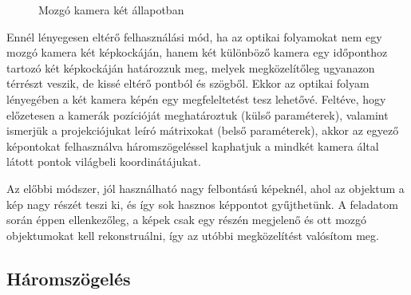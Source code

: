 \begin{figure}[tbh]
\caption{Mozgó kamera két állapotban \label{fig:triangulation}}
\end{figure}

Ennél lényegesen eltérő felhasználási mód, ha az optikai folyamokat nem egy mozgó kamera két képkockáján, hanem két különböző kamera egy időponthoz tartozó két képkockáján határozzuk meg, melyek megközelítőleg ugyanazon térrészt veszik, de kissé eltérő pontból és szögből. Ekkor az optikai folyam lényegében a két kamera képén egy megfeleltetést tesz lehetővé. Feltéve, hogy előzetesen a kamerák pozícióját meghatároztuk (külső paraméterek), valamint ismerjük a projekciójukat leíró mátrixokat (belső paraméterek), akkor az egyező képontokat felhasználva háromszögeléssel kaphatjuk a mindkét kamera által látott pontok világbeli koordinátájukat.

Az előbbi módszer, jól használható nagy felbontású képeknél, ahol az objektum a kép nagy részét teszi ki, és így sok hasznos képpontot gyűjthetünk. A feladatom során éppen ellenkezőleg, a képek csak egy részén megjelenő és ott mozgó objektumokat kell rekonstruálni, így az utóbbi megközelítést valósítom meg.


\subsection{Háromszögelés \label{sec:triangulation}}

